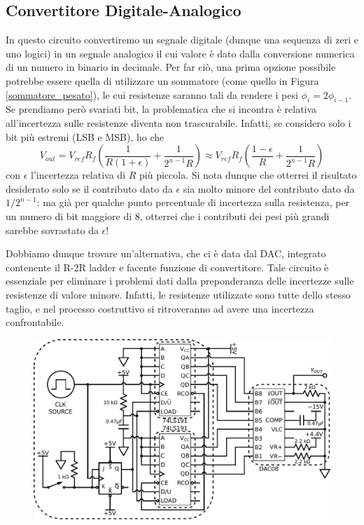 \subsection{Convertitore Digitale-Analogico}

In questo circuito convertiremo un segnale digitale (dunque una sequenza di zeri e uno logici) in un segnale analogico il cui valore è dato dalla conversione numerica di un numero in binario in decimale. Per far ciò, una prima opzione possibile potrebbe essere quella di utilizzare un sommatore (come quello in Figura \ref{sommatore_pesato}), le cui resistenze saranno tali da rendere i pesi $\phi_i = 2 \phi_{i -1}$. Se prendiamo però svariati bit, la problematica che si incontra è relativa all'incertezza sulle resistenze diventa non trascurabile. Infatti, se considero solo i bit più estremi (LSB e MSB), ho che
$$V_{out}=V_{ref} R_f \left( \frac{1}{R (1 + \epsilon)} + \frac{1}{2^{n-1}R}\right) \approx V_{ref} R_f \left( \frac{1 - \epsilon}{R} + \frac{1}{2^{n-1}R}\right)$$
con $\epsilon$ l'incertezza relativa di $R$ più piccola. Si nota dunque che otterrei il risultato desiderato solo se il contributo dato da $\epsilon$ sia molto minore del contributo dato da $1/2^{n-1}$: ma già per qualche punto percentuale di incertezza sulla resistenza, per un numero di bit maggiore di 8, otterrei che i contributi dei pesi più grandi sarebbe sovrastato da $\epsilon$!

Dobbiamo dunque trovare un'alternativa, che ci è data dal DAC, integrato contenente il R-2R ladder e facente funzione di convertitore. Tale circuito è essenziale per eliminare i problemi dati dalla preponderanza delle incertezze sulle resistenze di valore minore. Infatti, le resistenze utilizzate sono tutte dello stesso taglio, e nel processo costruttivo si ritroveranno ad avere una incertezza confrontabile.

\begin{figure}[htpc]
\centering
	\includegraphics[width=.85\textwidth]{../E12/latex/DAC.pdf}
	\caption{}
	\label{cir12:DAC}
\end{figure}

